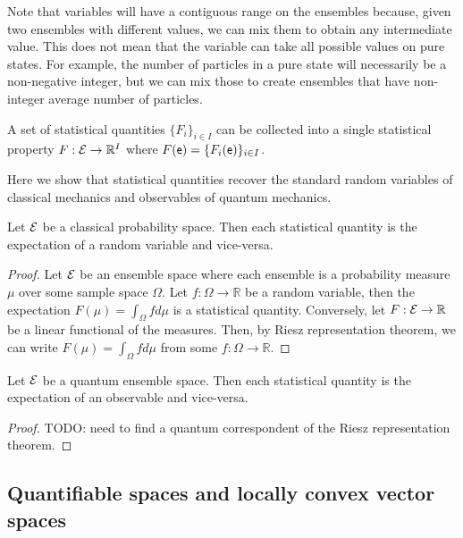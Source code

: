 \begin{remark}
	Note that variables will have a contiguous range on the ensembles because, given two ensembles with different values, we can mix them to obtain any intermediate value. This does not mean that the variable can take all possible values on pure states. For example, the number of particles in a pure state will necessarily be a non-negative integer, but we can mix those to create ensembles that have non-integer average number of particles.
\end{remark}

\begin{coro}
	A set of statistical quantities $\{F_i\}_{i \in I}$ can be collected into a single statistical property $F : \mathcal{E} \to \mathbb{R}^I$ where $F(\mathsf{e}) = \{F_i(\mathsf{e})\}_{i \in I}$.
\end{coro}

Here we show that statistical quantities recover the standard random variables of classical mechanics and observables of quantum mechanics.

\begin{prop}
	Let $\mathcal{E}$ be a classical probability space. Then each statistical quantity is the expectation of a random variable and vice-versa.
\end{prop}

\begin{proof}
	Let $\mathcal{E}$ be an ensemble space where each ensemble is a probability measure $\mu$ over some sample space $\Omega$. Let $f : \Omega \to \mathbb{R}$ be a random variable, then the expectation $F(\mu) = \int_{\Omega} f d\mu$ is a statistical quantity. Conversely, let $F : \mathcal{E} \to \mathbb{R}$ be a linear functional of the measures. Then, by Riesz representation theorem, we can write $F(\mu) = \int_{\Omega} f d\mu$ from some $f : \Omega \to \mathbb{R}$.
\end{proof}

\begin{conj}
	Let $\mathcal{E}$ be a quantum ensemble space. Then each statistical quantity is the expectation of an observable and vice-versa.
\end{conj}

\begin{proof}
	TODO: need to find a quantum correspondent of the Riesz representation theorem.
\end{proof}

\subsection{Quantifiable spaces and locally convex vector spaces}

